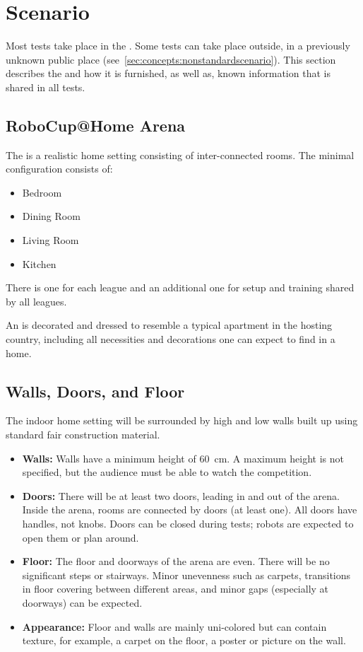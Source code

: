 \section{Scenario}
\label{sec:rules:scenario}
Most tests take place in the \RoboCup\AtHome{} \Arena{}. Some tests can take place outside, in a previously unknown public place (see~\ref{sec:concepts:nonstandardscenario}). This section describes the \Arena{} and how it is furnished,  as well as, known information that is shared in all tests. 

\subsection{RoboCup@Home Arena}
\label{sec:rules:scenario:arena}
The \RoboCup\AtHome{} \Arena{} is a realistic home setting consisting of inter-connected rooms.
The minimal configuration consists of:
\begin{itemize}
	\item Bedroom
	\item Dining Room
	\item Living Room
	\item Kitchen
\end{itemize}
There is one \Arena{} for each league and an additional one for setup and training shared by all leagues.

An \Arena{} is decorated and dressed to resemble a typical apartment in the hosting country, including all necessities and decorations one can expect to find in a home.

\subsection{Walls, Doors, and Floor}
\label{sec:rules:scenario:walls}
The indoor home setting will be surrounded by high and low walls built up using standard fair construction material.

\begin{itemize}
	\item \textbf{Walls:} Walls have a minimum height of \SI{60}{\centi\meter}. A maximum height is not specified, but the audience must be able to watch the competition.

	\item \textbf{Doors:} There will be at least two doors, leading in and out of the arena.
	Inside the arena, rooms are connected by doors (at least one).
	All doors have handles, not knobs.
	Doors can be closed during tests; robots are expected to open them or plan around.

	\item \textbf{Floor:} The floor and doorways of the arena are even.
	There will be no significant steps or stairways.
	Minor unevenness such as carpets, transitions in floor covering between different areas, and minor gaps (especially at doorways) can be expected.

	\item \textbf{Appearance:} Floor and walls are mainly uni-colored but can contain texture, for example, a carpet on the floor, a poster or picture on the wall.\\
\end{itemize}


